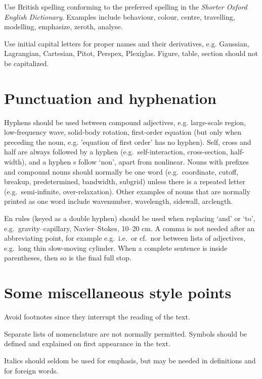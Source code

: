 \documentclass{jfm}
\begin{document}
Use British spelling conforming to the preferred spelling in the
\emph{Shorter Oxford English Dictionary}. Examples include behaviour, colour,
centre, travelling, modelling, emphasize, zeroth, analyse.

Use initial capital letters for proper names and their derivatives, e.g.
Gaussian, Lagrangian, Cartesian, Pitot, Perspex, Plexiglas. Figure, table,
section should not be capitalized.

\section{Punctuation and hyphenation}

Hyphens should be used between compound adjectives, e.g. large-scale
region, low-frequency wave, solid-body rotation, first-order equation (but
only when preceding the noun, e.g. 'equation of first order' has no hyphen).
Self, cross and half are always followed by a hyphen (e.g.\ self-interaction,
cross-section, half-width), and a hyphen s follow `non', apart
from nonlinear. Nouns with prefixes and compound nouns should normally be one
word (e.g.\ coordinate, cutoff, breakup, predetermined, bandwidth, subgrid)
unless there is a repeated letter (e.g.\ semi-infinite, over-relaxation).
Other examples of nouns that are normally printed as one word include
wavenumber, wavelength, sidewall, arclength.

En rules (keyed as a double hyphen) should be used when replacing `and' or
`to', e.g.\ gravity--capillary, Navier--Stokes, 10--20 cm. A comma is not
needed after an abbreviating point, for example e.g.\ i.e.\ or cf.\ nor
between lists of adjectives, e.g.\ long thin slow-moving cylinder. When a
complete sentence is inside parentheses, then so is the final full stop.

\section{Some miscellaneous style points}

Avoid footnotes since they interrupt the reading of the text.

Separate lists of nomenclature are not normally permitted. Symbols should be
defined and explained on first appearance in the text.

Italics should seldom be used for emphasis, but may be needed in definitions
and for foreign words.
\end{document}

